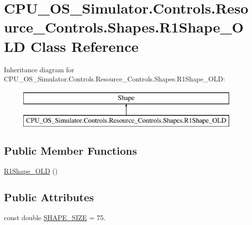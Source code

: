 \hypertarget{class_c_p_u___o_s___simulator_1_1_controls_1_1_resource___controls_1_1_shapes_1_1_r1_shape___o_l_d}{}\section{C\+P\+U\+\_\+\+O\+S\+\_\+\+Simulator.\+Controls.\+Resource\+\_\+\+Controls.\+Shapes.\+R1\+Shape\+\_\+\+O\+L\+D Class Reference}
\label{class_c_p_u___o_s___simulator_1_1_controls_1_1_resource___controls_1_1_shapes_1_1_r1_shape___o_l_d}
Inheritance diagram for C\+P\+U\+\_\+\+O\+S\+\_\+\+Simulator.\+Controls.\+Resource\+\_\+\+Controls.\+Shapes.\+R1\+Shape\+\_\+\+O\+L\+D\+:\begin{figure}[H]
\begin{center}
\leavevmode
\includegraphics[height=2.000000cm]{class_c_p_u___o_s___simulator_1_1_controls_1_1_resource___controls_1_1_shapes_1_1_r1_shape___o_l_d}
\end{center}
\end{figure}
\subsection*{Public Member Functions}
\begin{DoxyCompactItemize}
\item 
\hyperlink{class_c_p_u___o_s___simulator_1_1_controls_1_1_resource___controls_1_1_shapes_1_1_r1_shape___o_l_d_ac82fbda5f1eaa635197d7de786221829}{R1\+Shape\+\_\+\+O\+L\+D} ()
\end{DoxyCompactItemize}
\subsection*{Public Attributes}
\begin{DoxyCompactItemize}
\item 
const double \hyperlink{class_c_p_u___o_s___simulator_1_1_controls_1_1_resource___controls_1_1_shapes_1_1_r1_shape___o_l_d_a6df8c703cb31c224adee383848fce4c6}{S\+H\+A\+P\+E\+\_\+\+S\+I\+Z\+E} = 75.
\end{DoxyCompactItemize}
